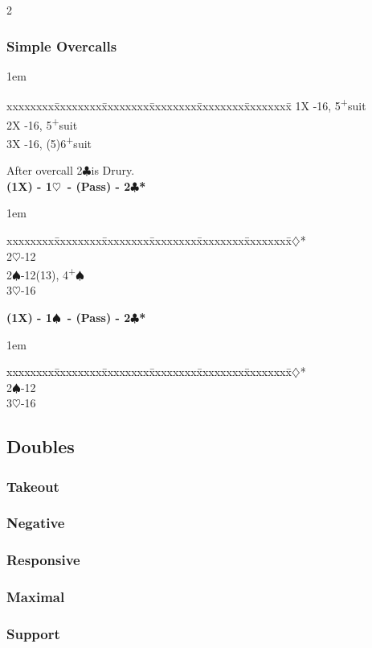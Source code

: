 \documentclass[10pt]{article}
\renewcommand{\c}{$\clubsuit$}
\renewcommand{\d}{$\diamondsuit$}
\newcommand{\h}{$\heartsuit$}
\newcommand{\s}{$\spadesuit$}
\newcommand{\p}{\textsuperscript{+}}
\newcommand{\m}{\textsuperscript{\textminus}}
\newenvironment{bidtable}[1][]
{\textbf{#1}
  \begin{adjustwidth}{1em}{}
    \addvspace{2pt}
    \begin{tabbing}
      xxxxxxxx\=xxxxxxxx\=xxxxxxxx\=xxxxxxxx\=xxxxxxxx\=xxxxxxxx\=\kill}
{\end{tabbing}\end{adjustwidth}\bigskip}%
\begin{document}
\begin{multicols*}{2}
\subsubsection{Simple Overcalls}

\begin{bidtable}
1X -16, 5\p suit     \\
2X -16, 5\p suit    \\
3X -16, (5)6\p suit
\end{bidtable}

After overcall 2\c is Drury.\\

\begin{bidtable}[(1X) - 1\h\ - (Pass) - 2\c*]
2\d*       {}\m                           \\
2\h        {}-12                         \\
2\s        {}-12(13), 4\p\s               \\
3\h        {}-16
\end{bidtable}

\begin{bidtable}[(1X) - 1\s\ - (Pass) - 2\c*]
2\d* {}\m   \\
2\s  {}-12 \\
3\h  {}-16
\end{bidtable}

\subsection{Doubles}

\subsubsection{Takeout}

\subsubsection{Negative}

\subsubsection{Responsive}

\subsubsection{Maximal}

\subsubsection{Support}


\end{multicols*}
\end{document}
